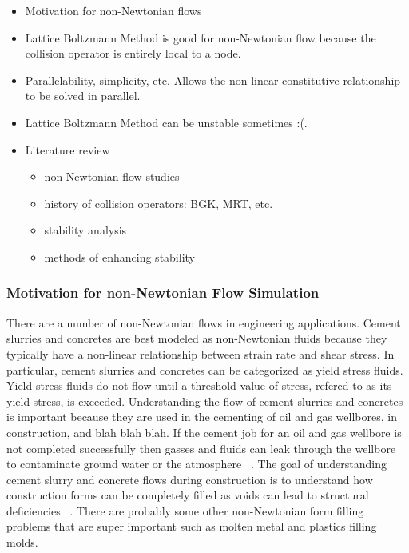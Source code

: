 \documentclass{article}
\begin{document}
\begin{itemize}
	\item Motivation for non-Newtonian flows
	\item Lattice Boltzmann Method is good for non-Newtonian flow because the collision operator is entirely local to a node.
	\item Parallelability, simplicity, etc. Allows the non-linear constitutive relationship to be solved in parallel.
	\item Lattice Boltzmann Method can be unstable sometimes :(.
	\item Literature review
	\begin{itemize}
		\item non-Newtonian flow studies
		\item history of collision operators: BGK, MRT, etc.
		\item stability analysis
		\item methods of enhancing stability
	\end{itemize}
\end{itemize}

\subsubsection{Motivation for non-Newtonian Flow Simulation}

There are a number of non-Newtonian flows in engineering applications.
Cement slurries and concretes are best modeled as non-Newtonian fluids because they typically have a non-linear relationship between strain rate and shear stress.
In particular, cement slurries and concretes can be categorized as yield stress fluids. 
Yield stress fluids do not flow until a threshold value of stress, refered to as its yield stress, is exceeded.
Understanding the flow of cement slurries and concretes is important because they are used in the cementing of oil and gas wellbores, in construction, and blah blah blah.
If the cement job for an oil and gas wellbore is not completed successfully then gasses and fluids can leak through the wellbore to contaminate ground water or the atmosphere ~\cite{grasinger2015simulation}.
The goal of understanding cement slurry and concrete flows during construction is to understand how construction forms can be completely filled as voids can lead to structural deficiencies ~\cite{RARR}.
There are probably some other non-Newtonian form filling problems that are super important such as molten metal and plastics filling molds.
\end{document}
